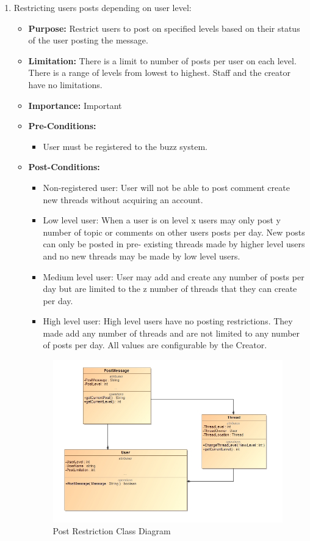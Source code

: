 \documentclass[11pt]{article}
\begin{document}
\begin{enumerate}
\item  Restricting users posts depending on user level:
\begin{itemize}	
		\item \textbf{Purpose:} Restrict users to post on specified levels based on their status of the user posting the message.
		\item\textbf{Limitation: }There is a limit to number of posts per user on each level.
		 There is a range of levels from lowest to highest.
		 Staff and the creator have no limitations.
		\item\textbf{Importance:} Important

		\item\textbf{Pre-Conditions: }
		\begin{itemize}
			 \item User must be registered to the buzz system.
		 \end{itemize}
		 
		\item\textbf{Post-Conditions: }
		\begin{itemize}
			\item Non-registered user:
			User will not be able to post comment create new threads without acquiring an account.
			\item Low level user:
			When a user is on level x users may only post y number of topic or comments on other users posts per day. New posts can only be posted in pre-		existing threads made by higher level users and no new threads may be made by low level users. 
			\item Medium level user:
			User may add and create any number of posts per day but are limited to the z number of threads that they can create per day.
			\item High level user:
			High level users have no posting restrictions. They made add any number of threads and are not limited to any number of posts per day.
		 	All values are configurable by the Creator.
		 \end{itemize}

	 \graphicspath{ {../Diagrams/Andrew/} }
			\begin{figure}[H]	
			  	\includegraphics[scale=0.5]{B1ClassDiagram.png}
				\caption{Post Restriction Class Diagram}
			\end{figure}
			

\end{itemize}
\end{enumerate}
\end{document}
